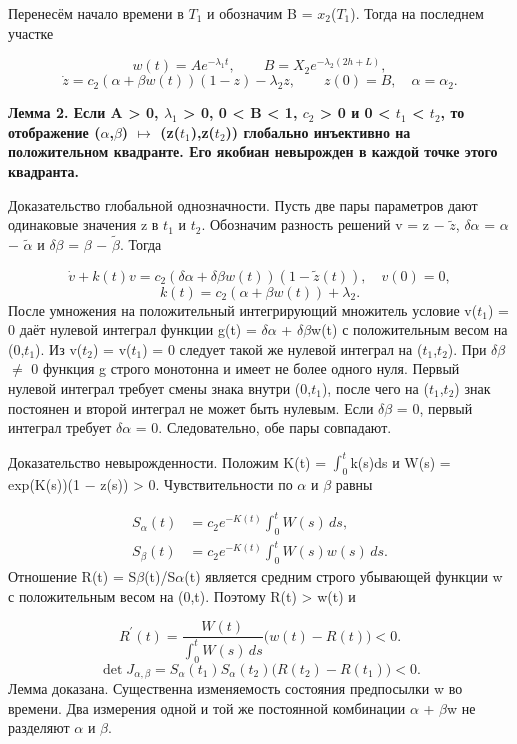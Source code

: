 \documentclass[blind]{psta}
\begin{document}
Перенесём начало времени в $T_{1}$ и обозначим B = $x_{2}$($T_{1}$). Тогда на последнем участке

\[
w(t)=Ae^{-\lambda_1t},\qquad B=X_2e^{-\lambda_2(2h+L)},
\]
\[
\dot z=c_2(\alpha+\beta w(t))(1-z)-\lambda_2z,\qquad z(0)=B,\quad \alpha=\alpha_2.
\]
\par\medskip\noindent\textbf{Лемма 2. Если A > 0, $\lambda_{1}$ > 0, 0 < B < 1, $c_{2}$ > 0 и 0 < $t_{1}$ < $t_{2}$, то отображение ($\alpha$,$\beta$) $\mapsto$ (z($t_{1}$),z($t_{2}$)) глобально инъективно на положительном квадранте. Его якобиан невырожден в каждой точке этого квадранта.}\par\smallskip
Доказательство глобальной однозначности. Пусть две пары параметров дают одинаковые значения z в $t_{1}$ и $t_{2}$. Обозначим разность решений v = z $-$ $\widetilde{z}$, $\delta$$\alpha$ = $\alpha$ $-$ $\widetilde{\alpha}$ и $\delta$$\beta$ = $\beta$ $-$ $\widetilde{\beta}$. Тогда

\[
\dot v+k(t)v=c_2(\delta\alpha+\delta\beta w(t))(1-\widetilde z(t)),\quad v(0)=0,
\]
\[
k(t)=c_2(\alpha+\beta w(t))+\lambda_2.
\]
После умножения на положительный интегрирующий множитель условие v($t_{1}$) = 0 даёт нулевой интеграл функции g(t) = $\delta$$\alpha$ + $\delta$$\beta$w(t) с положительным весом на (0,$t_{1}$). Из v($t_{2}$) = v($t_{1}$) = 0 следует такой же нулевой интеграл на ($t_{1}$,$t_{2}$). При $\delta$$\beta$ $\ne$ 0 функция g строго монотонна и имеет не более одного нуля. Первый нулевой интеграл требует смены знака внутри (0,$t_{1}$), после чего на ($t_{1}$,$t_{2}$) знак постоянен и второй интеграл не может быть нулевым. Если $\delta$$\beta$ = 0, первый интеграл требует $\delta$$\alpha$ = 0. Следовательно, обе пары совпадают.

Доказательство невырожденности. Положим K(t) = $\int_0^t$k(s)ds и W(s) = exp(K(s))(1 $-$ z(s)) > 0. Чувствительности по $\alpha$ и $\beta$ равны

\[
\begin{aligned}S_\alpha(t)&=c_2e^{-K(t)}\int_0^tW(s)\,ds,\\S_\beta(t)&=c_2e^{-K(t)}\int_0^tW(s)w(s)\,ds.\end{aligned}
\]
Отношение R(t) = S$\beta$(t)/S$\alpha$(t) является средним строго убывающей функции w с положительным весом на (0,t). Поэтому R(t) > w(t) и

\[
R^{\prime}(t)=\frac{W(t)}{\int_0^t W(s)\,ds}\bigl(w(t)-R(t)\bigr)<0.
\]
\[
\det J_{\alpha,\beta}=S_\alpha(t_1)S_\alpha(t_2)\bigl(R(t_2)-R(t_1)\bigr)<0.
\]
Лемма доказана. Существенна изменяемость состояния предпосылки w во времени. Два измерения одной и той же постоянной комбинации $\alpha$ + $\beta$w не разделяют $\alpha$ и $\beta$.
\end{document}
